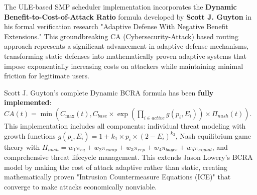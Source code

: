 \documentclass[11pt,a4paper]{article}
\begin{document}
The ULE-based SMP scheduler implementation incorporates the \textbf{Dynamic Benefit-to-Cost-of-Attack Ratio} formula developed by \textbf{Scott J. Guyton} in his formal verification research "Adaptive Defense With Negative Benefit Extensions." This groundbreaking CA (Cybersecurity-Attack) based routing approach represents a significant advancement in adaptive defense mechanisms, transforming static defenses into mathematically proven adaptive systems that impose exponentially increasing costs on attackers while maintaining minimal friction for legitimate users.

Scott J. Guyton's complete Dynamic BCRA formula has been \textbf{fully implemented}: $CA(t) = \min(C_{\max}(t), C_{base} \times \exp(\prod_{i \in active} g(p_i, E_i)) \times \Pi_{nash}(t))$. This implementation includes all components: individual threat modeling with growth functions $g(p_i, E_i) = 1 + k_1 \times p_i \times (2 - E_i)^{k_2}$, Nash equilibrium game theory with $\Pi_{nash} = w_1\pi_{eq} + w_2\pi_{comp} + w_3\pi_{rep} + w_4\pi_{bayes} + w_5\pi_{signal}$, and comprehensive threat lifecycle management. This extends Jason Lowery's BCRA model by making the cost of attack adaptive rather than static, creating mathematically proven "Intrusion Countermeasure Equations (ICE)" that converge to make attacks economically nonviable.
\end{document}
